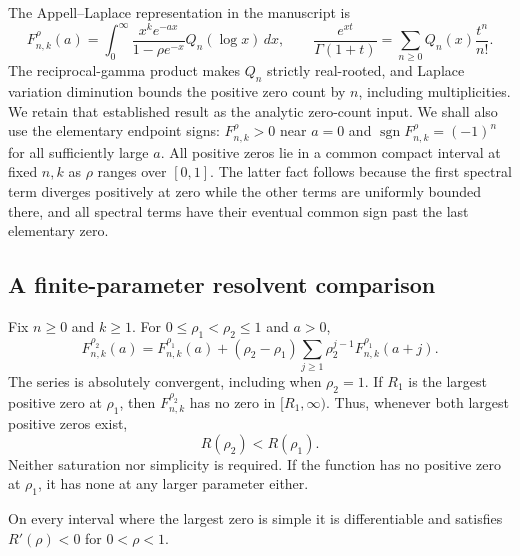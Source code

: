 The Appell--Laplace representation in the manuscript is
\begin{equation}\label{lershape:eq:laplace}
 F_{n,k}^{\rho}(a)=\int_0^\infty
 \frac{x^ke^{-ax}}{1-\rho e^{-x}}Q_n(\log x)\,dx,
 \qquad
 \frac{e^{xt}}{\Gamma(1+t)}=\sum_{n\geq0}Q_n(x)\frac{t^n}{n!}.
\end{equation}
The reciprocal-gamma product makes $Q_n$ strictly real-rooted, and
Laplace variation diminution bounds the positive zero count by $n$,
including multiplicities. We retain that established result as the
analytic zero-count input. We shall also use the elementary endpoint
signs: $F_{n,k}^{\rho}>0$ near $a=0$ and
$\operatorname{sgn}F_{n,k}^{\rho}=(-1)^n$ for all sufficiently large $a$.
All positive zeros lie in a common compact interval at fixed $n,k$ as
$\rho$ ranges over $[0,1]$. The latter fact follows because the first
spectral term diverges positively at zero while the other terms are
uniformly bounded there, and all spectral terms have their eventual
common sign past the last elementary zero.

\subsection{A finite-parameter resolvent comparison}

\begin{theorem}
\label{lershape:thm:resolvent}
Fix $n\geq0$ and $k\geq1$. For $0\leq\rho_1<\rho_2\leq1$ and $a>0$,
\begin{equation}\label{lershape:eq:resolvent}
 F_{n,k}^{\rho_2}(a)=F_{n,k}^{\rho_1}(a)
 +(\rho_2-\rho_1)\sum_{j\geq1}\rho_2^{j-1}
 F_{n,k}^{\rho_1}(a+j).
\end{equation}
The series is absolutely convergent, including when $\rho_2=1$.
If $R_1$ is the largest positive zero at $\rho_1$, then
$F_{n,k}^{\rho_2}$ has no zero in $[R_1,\infty)$. Thus, whenever both
largest positive zeros exist,
\begin{equation}\label{lershape:eq:last-order}
 R(\rho_2)<R(\rho_1).
\end{equation}
Neither saturation nor simplicity is required. If the function has no
positive zero at $\rho_1$, it has none at any larger parameter either.

On every interval where the largest zero is simple it is differentiable
and satisfies $R'(\rho)<0$ for $0<\rho<1$.
\end{theorem}

